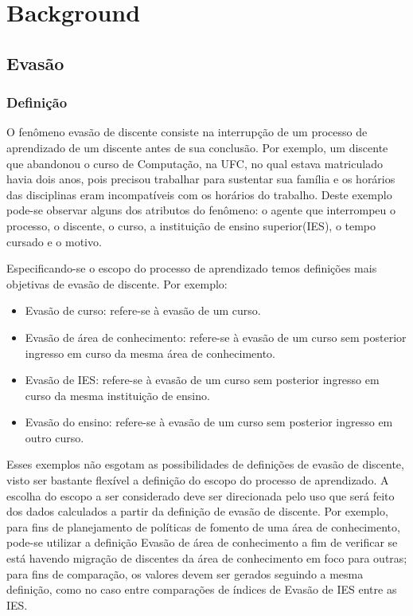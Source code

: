 \documentclass{report}
\begin{document}
\listoftodos

\tableofcontents

\chapter{Background}

\section{Evasão}
\cite{esclarecimentos_calculos}
\cite{mudanca_calculos}

\subsection{Definição}
O fenômeno evasão de discente consiste na interrupção de um processo de aprendizado de um discente antes de sua conclusão. Por exemplo, um discente que abandonou o curso de Computação, na UFC, no qual estava matriculado havia dois anos, pois precisou trabalhar para sustentar sua família e os horários das disciplinas eram incompatíveis com os horários do trabalho. Deste exemplo pode-se observar alguns dos atributos do fenômeno: o agente que interrompeu o processo, o discente, o curso, a instituição de ensino superior(IES), o tempo cursado e o motivo.

Especificando-se o escopo do processo de aprendizado temos definições mais objetivas de evasão de discente. Por exemplo:
\begin{itemize}
\item Evasão de curso: refere-se à evasão de um curso.
\item Evasão de área de conhecimento: refere-se à evasão de um curso sem posterior ingresso em curso da mesma área de conhecimento.
\item Evasão de IES: refere-se à evasão de um curso sem posterior ingresso em curso da mesma instituição de ensino. 
\item Evasão do ensino: refere-se à evasão de um curso sem posterior ingresso em outro curso.
\end{itemize}

Esses exemplos não esgotam as possibilidades de definições de evasão de discente, visto ser bastante flexível a definição do escopo do processo de aprendizado. A escolha do escopo a ser considerado deve ser direcionada pelo uso que será feito dos dados calculados a partir da definição de evasão de discente. Por exemplo, para fins de planejamento de políticas de fomento de uma área de conhecimento, pode-se utilizar a definição Evasão de área de conhecimento a fim de verificar se está havendo migração de discentes da área de conhecimento em foco para outras; para fins de comparação, os valores devem ser gerados seguindo a mesma definição, como no caso entre comparações de índices de Evasão de IES entre as IES.
\end{document}
